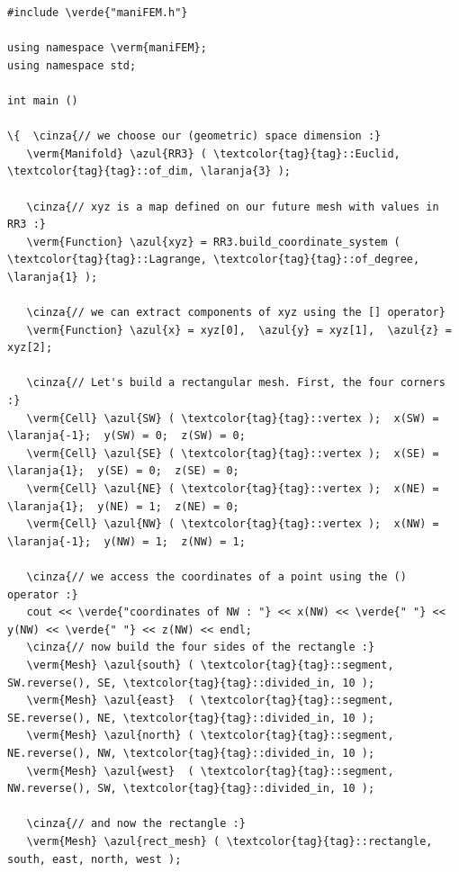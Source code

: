 \begin{Verbatim}[commandchars=\\\{\},formatcom=\small\tt,frame=single,
   label=parag-\ref{\numb section 1.\numb parag 1}.cpp,rulecolor=\color{coment},
   baselinestretch=0.94,framesep=2mm                                            ]
#include \verde{"maniFEM.h"}

using namespace \verm{maniFEM};
using namespace std;

int main ()

\{  \cinza{// we choose our (geometric) space dimension :}
   \verm{Manifold} \azul{RR3} ( \textcolor{tag}{tag}::Euclid, \textcolor{tag}{tag}::of_dim, \laranja{3} );
   
   \cinza{// xyz is a map defined on our future mesh with values in RR3 :}
   \verm{Function} \azul{xyz} = RR3.build_coordinate_system ( \textcolor{tag}{tag}::Lagrange, \textcolor{tag}{tag}::of_degree, \laranja{1} );

   \cinza{// we can extract components of xyz using the [] operator}
   \verm{Function} \azul{x} = xyz[0],  \azul{y} = xyz[1],  \azul{z} = xyz[2];

   \cinza{// Let's build a rectangular mesh. First, the four corners :}
   \verm{Cell} \azul{SW} ( \textcolor{tag}{tag}::vertex );  x(SW) = \laranja{-1};  y(SW) = 0;  z(SW) = 0;
   \verm{Cell} \azul{SE} ( \textcolor{tag}{tag}::vertex );  x(SE) =  \laranja{1};  y(SE) = 0;  z(SE) = 0;
   \verm{Cell} \azul{NE} ( \textcolor{tag}{tag}::vertex );  x(NE) =  \laranja{1};  y(NE) = 1;  z(NE) = 0;
   \verm{Cell} \azul{NW} ( \textcolor{tag}{tag}::vertex );  x(NW) = \laranja{-1};  y(NW) = 1;  z(NW) = 1;
   
   \cinza{// we access the coordinates of a point using the () operator :}								
   cout << \verde{"coordinates of NW : "} << x(NW) << \verde{" "} << y(NW) << \verde{" "} << z(NW) << endl;
   \cinza{// now build the four sides of the rectangle :}
   \verm{Mesh} \azul{south} ( \textcolor{tag}{tag}::segment, SW.reverse(), SE, \textcolor{tag}{tag}::divided_in, 10 );
   \verm{Mesh} \azul{east}  ( \textcolor{tag}{tag}::segment, SE.reverse(), NE, \textcolor{tag}{tag}::divided_in, 10 );
   \verm{Mesh} \azul{north} ( \textcolor{tag}{tag}::segment, NE.reverse(), NW, \textcolor{tag}{tag}::divided_in, 10 );
   \verm{Mesh} \azul{west}  ( \textcolor{tag}{tag}::segment, NW.reverse(), SW, \textcolor{tag}{tag}::divided_in, 10 );
   
   \cinza{// and now the rectangle :}
   \verm{Mesh} \azul{rect_mesh} ( \textcolor{tag}{tag}::rectangle, south, east, north, west );


\end{Verbatim}
